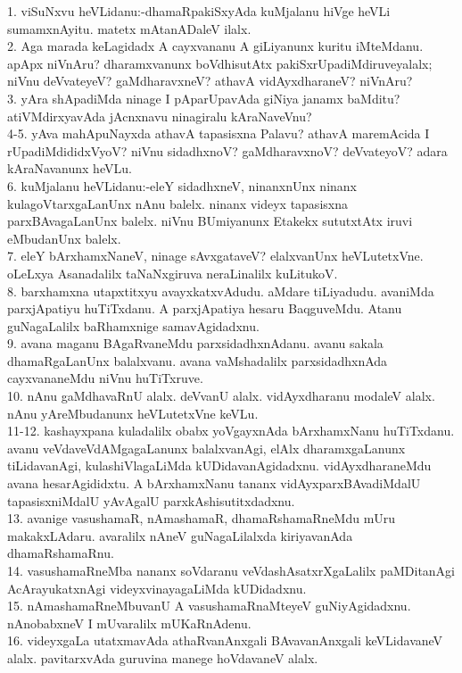 \documentclass{article}
\begin{document}
1. viSuNxvu heVLidanu:-dhamaRpakiSxyAda kuMjalanu hiVge heVLi sumamxnAyitu. matetx mAtanADaleV ilalx.\\
2. Aga marada keLagidadx A cayxvananu A giLiyanunx kuritu iMteMdanu. apApx niVnAru? dharamxvanunx boVdhisutAtx pakiSxrUpadiMdiruveyalalx; niVnu deVvateyeV? gaMdharavxneV? athavA vidAyxdharaneV? niVnAru?\\
3. yAra shApadiMda ninage I pAparUpavAda giNiya janamx baMditu? atiVMdirxyavAda jAcnxnavu ninagiralu kAraNaveVnu?\\
4-5. yAva mahApuNayxda athavA tapasisxna Palavu? athavA maremAcida I rUpadiMdididxVyoV? niVnu sidadhxnoV? gaMdharavxnoV? deVvateyoV? adara kAraNavanunx heVLu.\\
6. kuMjalanu heVLidanu:-eleY sidadhxneV, ninanxnUnx ninanx kulagoVtarxgaLanUnx nAnu balelx. ninanx videyx tapasisxna parxBAvagaLanUnx balelx. niVnu BUmiyanunx Etakekx sututxtAtx iruvi eMbudanUnx balelx.\\
7. eleY bArxhamxNaneV, ninage sAvxgataveV? elalxvanUnx heVLutetxVne. oLeLxya Asanadalilx taNaNxgiruva neraLinalilx kuLitukoV.\\
8. barxhamxna utapxtitxyu avayxkatxvAdudu. aMdare tiLiyadudu. avaniMda parxjApatiyu huTiTxdanu. A parxjApatiya hesaru BaqguveMdu. Atanu guNagaLalilx baRhamxnige samavAgidadxnu.\\
9. avana maganu BAgaRvaneMdu parxsidadhxnAdanu. avanu sakala dhamaRgaLanUnx balalxvanu. avana vaMshadalilx parxsidadhxnAda cayxvananeMdu niVnu huTiTxruve.\\
10. nAnu gaMdhavaRnU alalx. deVvanU alalx. vidAyxdharanu modaleV alalx. nAnu yAreMbudanunx heVLutetxVne keVLu.\\
11-12. kashayxpana kuladalilx obabx yoVgayxnAda bArxhamxNanu huTiTxdanu. avanu veVdaveVdAMgagaLanunx balalxvanAgi, elAlx dharamxgaLanunx tiLidavanAgi, kulashiVlagaLiMda kUDidavanAgidadxnu. vidAyxdharaneMdu avana hesarAgididxtu. A bArxhamxNanu tananx vidAyxparxBAvadiMdalU tapasisxniMdalU yAvAgalU parxkAshisutitxdadxnu.\\
13. avanige vasushamaR, nAmashamaR, dhamaRshamaRneMdu mUru makakxLAdaru. avaralilx nAneV guNagaLilalxda kiriyavanAda dhamaRshamaRnu.\\
14. vasushamaRneMba nananx soVdaranu veVdashAsatxrXgaLalilx paMDitanAgi AcArayukatxnAgi videyxvinayagaLiMda kUDidadxnu.\\
15. nAmashamaRneMbuvanU A vasushamaRnaMteyeV guNiyAgidadxnu. nAnobabxneV I mUvaralilx mUKaRnAdenu.\\
16. videyxgaLa utatxmavAda athaRvanAnxgali BAvavanAnxgali keVLidavaneV alalx. pavitarxvAda guruvina manege hoVdavaneV alalx.\\
\end{document}
